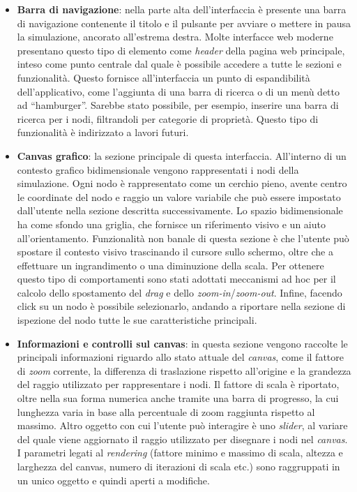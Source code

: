 \begin{itemize}
	\item \textbf{Barra di navigazione}: nella parte alta dell'interfaccia è presente una barra di navigazione contenente il titolo e il pulsante per avviare o mettere in pausa la simulazione, ancorato all'estrema destra. Molte interfacce web moderne presentano questo tipo di elemento come \textit{header} della pagina web principale, inteso come punto centrale dal quale è possibile accedere a tutte le sezioni e funzionalità. Questo fornisce all'interfaccia un punto di espandibilità dell'applicativo, come l'aggiunta di una barra di ricerca o di un menù detto ad ``hamburger''. Sarebbe stato possibile, per esempio, inserire una barra di ricerca per i nodi, filtrandoli per categorie di proprietà. Questo tipo di funzionalità è indirizzato a lavori futuri. 
	\item \textbf{Canvas grafico}: la sezione principale di questa interfaccia. All'interno di un contesto grafico bidimensionale vengono rappresentati i nodi della simulazione. Ogni nodo è rappresentato come un cerchio pieno, avente centro le coordinate del nodo e raggio un valore variabile che può essere impostato dall'utente nella sezione descritta successivamente. Lo spazio bidimensionale ha come sfondo una griglia, che  fornisce un riferimento visivo e un aiuto all'orientamento. Funzionalità non banale di questa sezione è che l'utente può spostare il contesto visivo trascinando il cursore sullo schermo, oltre che a effettuare un ingrandimento o una diminuzione della scala. Per ottenere questo tipo di comportamenti sono stati adottati meccanismi ad hoc per il calcolo dello spostamento del \textit{drag} e dello \textit{zoom-in}/\textit{zoom-out}. Infine, facendo click su un nodo è possibile selezionarlo, andando a riportare nella sezione di ispezione del nodo tutte le sue caratteristiche principali.
	\item \textbf{Informazioni e controlli sul canvas}: in questa sezione vengono raccolte le principali informazioni riguardo allo stato attuale del \textit{canvas}, come il fattore di \textit{zoom} corrente, la differenza di traslazione rispetto all'origine e la grandezza del raggio utilizzato per rappresentare i nodi. Il fattore di scala è riportato, oltre nella sua forma numerica anche tramite una barra di progresso, la cui lunghezza varia in base alla percentuale di zoom raggiunta rispetto al massimo. Altro oggetto con cui l'utente può interagire è uno \textit{slider}, al variare del quale viene aggiornato il raggio utilizzato per disegnare i nodi nel \textit{canvas}. I parametri legati al \textit{rendering} (fattore minimo e massimo di scala, altezza e larghezza del canvas, numero di iterazioni di scala etc.) sono raggruppati in un unico oggetto e quindi aperti a modifiche.

\end{itemize}
